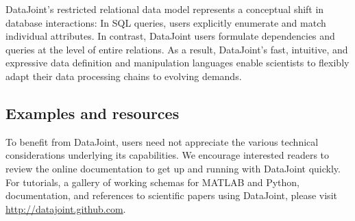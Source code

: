 \documentclass[10pt,letterpaper]{article}
\begin{document}
DataJoint's restricted relational data model represents a conceptual shift in database interactions: In SQL queries, users explicitly enumerate and match individual attributes.
In contrast, DataJoint users formulate dependencies and queries at the level of entire relations.
As a result, DataJoint's fast, intuitive, and expressive data definition and manipulation languages enable scientists to flexibly adapt their data processing chains to evolving demands.

\subsection*{Examples and resources}
To benefit from DataJoint, users need not appreciate the various technical considerations underlying its capabilities.
We encourage interested readers to review the online documentation to get up and running with DataJoint quickly.
For tutorials, a gallery of working schemas for MATLAB and Python, documentation, and references to scientific papers using DataJoint, please visit \url{http://datajoint.github.com}.



\end{document}
